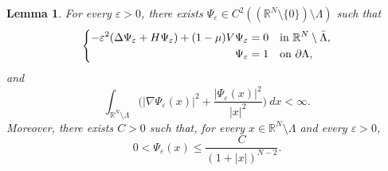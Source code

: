 \documentclass[a4paper]{amsart}
\newtheorem{lemma}[proposition]{Lemma}
\begin{document}
\begin{lemma}
\label{lemmaPsiepsilon}
For every $\varepsilon > 0$, there exists $\Psi_\varepsilon \in C^2\left(({\mathbb{R}}^N\setminus \lbrace 0 \rbrace) \setminus \Lambda
\right)$ such that
\[
 \left\{ \begin{aligned}
          -\varepsilon^2(\Delta \Psi_\varepsilon + H \Psi_\varepsilon)+(1-\mu)V\Psi_\varepsilon &= 0 & &\text{in}\ {\mathbb{R}}^N\setminus
\Bar{\Lambda}, \\
	\Psi_{\varepsilon} &= 1 & &\text{on}\ \partial \Lambda,
         \end{aligned}
 \right.
\]
and
\begin{equation}
\label{PsiepsilonFiniteIntegral}
 \int_{{\mathbb{R}}^N\setminus \Lambda} \biggl( {\left| {\nabla \Psi_\varepsilon(x)} \right|}^2 + \frac{{\left| {\Psi_\varepsilon(x)} \right|}^2}{{\left| {x} \right|}^2}
\biggr)\: dx <
\infty.
\end{equation}
Moreover, there exists $C > 0$ such that, for every $x \in {\mathbb{R}}^N\setminus \Lambda$ and every $\varepsilon > 0$, 
\begin{equation}
\label{DecayPsiepsilon}
 0 < \Psi_\varepsilon(x) \leq \frac{C}{(1+{\left| {x} \right|})^{N-2}}.
\end{equation}
\end{lemma}
\end{document}
